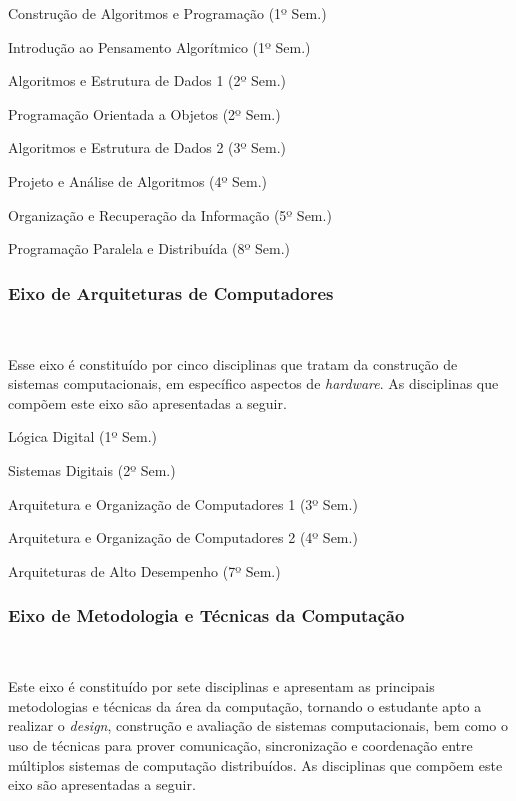 \begin{compenum}
    \item Construção de Algoritmos e Programação (1º Sem.)
    \item Introdução ao Pensamento Algorítmico (1º Sem.)
    \item Algoritmos e Estrutura de Dados 1 (2º Sem.)
    \item Programação Orientada a Objetos (2º Sem.)
    \item Algoritmos e Estrutura de Dados 2 (3º Sem.)
    \item Projeto e Análise de Algoritmos (4º Sem.)
    \item Organização e Recuperação da Informação (5º Sem.)
    \item Programação Paralela e Distribuída (8º Sem.)
\end{compenum}

\subsubsection{Eixo de Arquiteturas de Computadores}~\label{sec:E5}

Esse eixo é constituído por cinco disciplinas que tratam da construção de sistemas computacionais, em específico aspectos de \textit{hardware}. As disciplinas que compõem este eixo são apresentadas a seguir.

\begin{compenum}
    \item Lógica Digital (1º Sem.)
    \item Sistemas Digitais (2º Sem.)
    \item Arquitetura e Organização de Computadores 1 (3º Sem.)
    \item Arquitetura e Organização de Computadores 2 (4º Sem.)
    \item Arquiteturas de Alto Desempenho (7º Sem.)
\end{compenum}

\subsubsection{Eixo de Metodologia e Técnicas da Computação }~\label{sec:E6}

Este eixo é constituído por sete disciplinas e apresentam as principais metodologias e técnicas da área da computação, tornando o estudante apto a realizar o \textit{design}, construção e avaliação de sistemas computacionais, bem como o uso de técnicas para prover comunicação, sincronização e coordenação entre múltiplos sistemas de computação distribuídos.
As disciplinas que compõem este eixo são apresentadas a seguir.

